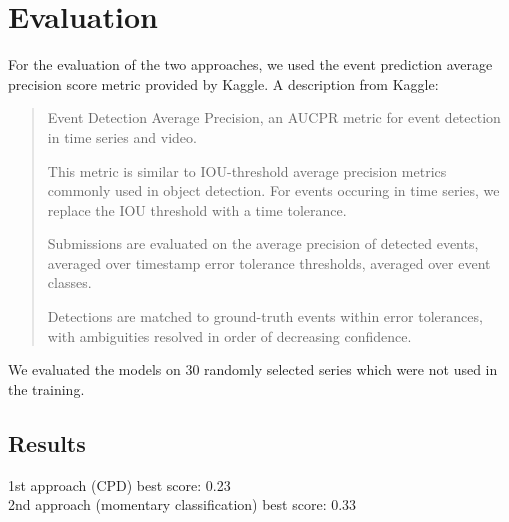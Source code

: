 \documentclass{article}
\begin{document}
\section{Evaluation}

For the evaluation of the two approaches, we used the event prediction average precision score metric provided by Kaggle. A description from Kaggle:
\begin{quote}
    Event Detection Average Precision, an AUCPR metric for event detection in
    time series and video.

    This metric is similar to IOU-threshold average precision metrics commonly
    used in object detection. For events occuring in time series, we replace the
    IOU threshold with a time tolerance.

    Submissions are evaluated on the average precision of detected events,
    averaged over timestamp error tolerance thresholds, averaged over event
    classes.

    Detections are matched to ground-truth events within error tolerances, with
    ambiguities resolved in order of decreasing confidence.
\end{quote}

We evaluated the models on 30 randomly selected series which were not used in the training.

\subsection{Results}
1st approach (CPD) best score: 0.23\\
2nd approach (momentary classification) best score: 0.33




\end{document}
